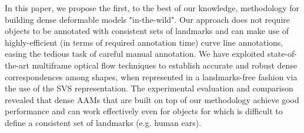 In this paper, we propose the first, to the best of our knowledge, methodology for building dense deformable models "in-the-wild". Our approach does not require objects to be annotated with consistent sets of landmarks and can make use of highly-efficient (in terms of required annotation time) curve line annotations, easing the tedious task of careful manual annotation. We have exploited state-of-the-art multiframe optical flow techniques to establish accurate and robust dense correspondences among shapes, when represented in a landmarks-free fashion via the use of the SVS representation. The experimental evaluation and comparison revealed that dense AAMs that are built on top of our methodology achieve good performance and can work effectively even for objects for which is difficult to define a consistent set of landmarks (e.g. human ears).